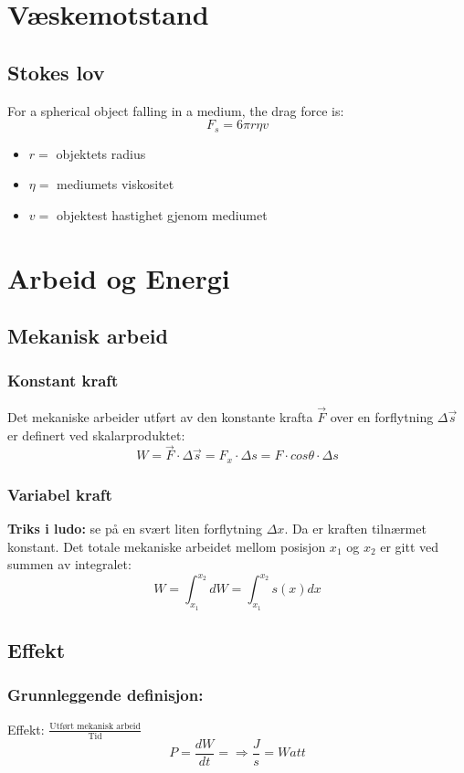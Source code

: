 \documentclass[12pt]{article}
\begin{document}
\section{Væskemotstand}
\subsection{Stokes lov}
For a spherical object falling in a medium, the drag force is:
$$F_s = 6\pi r\eta v$$
\begin{itemize}
    \item[] $r =$ objektets radius
    \item[] $\eta =$ mediumets viskositet
    \item[] $v =$ objektest hastighet gjenom mediumet
\end{itemize}

\section{Arbeid og Energi}
\subsection{Mekanisk arbeid}
\subsubsection{Konstant kraft}
Det mekaniske arbeider utført av den konstante krafta $\Vec{F}$ over en forflytning $\Delta\Vec{s}$ er definert ved skalarproduktet:
$$W = \Vec{F} \cdot \Delta\Vec{s} = F_x \cdot \Delta s = F \cdot cos\theta \cdot\Delta s$$
%
\subsubsection{Variabel kraft}
\textbf{Triks i ludo:} se på en svært liten forflytning $\Delta x$. Da er kraften tilnærmet konstant.
Det totale mekaniske arbeidet mellom posisjon $x_1$ og $x_2$ er gitt ved summen av integralet:
$$W = \int_{x_1}^{x_2} dW = \int_{x_1}^{x_2} s(x) dx $$
%
\subsection{Effekt}
\subsubsection{Grunnleggende definisjon:} 
Effekt: $\frac{\text{Utført mekanisk arbeid}}{\text{Tid}}$
$$P = \frac{dW}{dt} = \Rightarrow \frac{J}{s} = Watt$$
\end{document}
